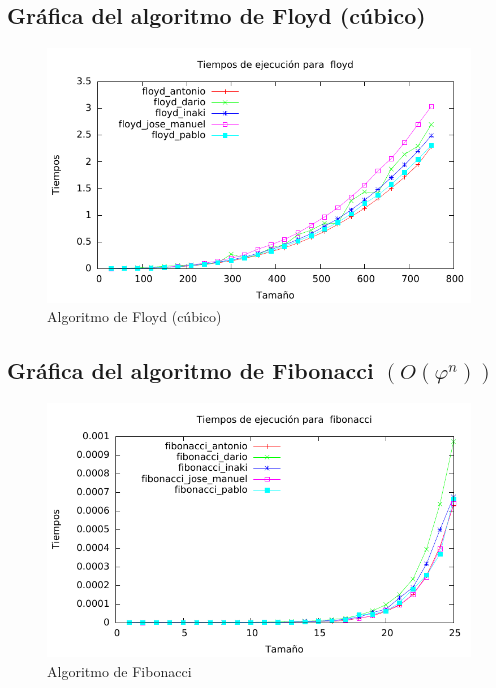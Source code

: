 \documentclass[a4paper, 11pt]{article}
\begin{document}
\subsection{Gráfica del algoritmo de Floyd (cúbico)}
\begin{figure}[H] \includegraphics[width=16cm]{floyd_todos_g} \centering
	\caption{Algoritmo de Floyd (cúbico)} \end{figure}

\subsection{Gráfica del algoritmo de Fibonacci $(O(\varphi^n))$}
\begin{figure}[H] \includegraphics[width=16cm]{fibonacci_todos_g} \centering
	\caption{Algoritmo de Fibonacci} \end{figure}
\end{document}
